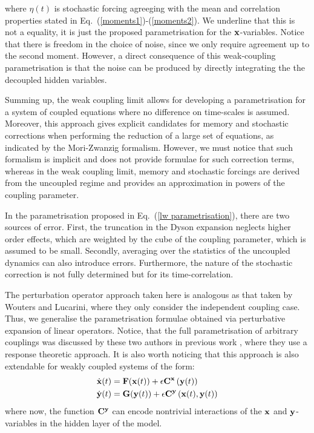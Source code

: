 \documentclass[12pt]{article}
\begin{document}
where $\eta(t)$ is stochastic forcing agreeging with the mean and correlation properties stated in Eq.~(\ref{moments1})-(\ref{moments2}). We underline that this is not a equality, it is just the proposed parametrisation for the $\mathbf{x}$-variables. Notice that there is freedom in the choice of noise, since we only require agreement up to the second moment. However, a direct consequence of this weak-coupling parametrisation is that the noise can be produced by directly integrating the the decoupled hidden variables.

Summing up, the weak coupling limit allows for developing a parametrisation for a system of coupled equations where no difference on time-scales is assumed. Moreover, this approach gives explicit candidates for memory and stochastic corrections when performing the reduction of a large set of equations, as indicated by the Mori-Zwanzig formalism. However, we must notice that such formalism is implicit and does not provide formulae for such correction terms, whereas in the weak coupling limit, memory and stochastic forcings are derived from the uncoupled regime and provides an approximation in powers of the coupling parameter.

In the parametrisation proposed in Eq.~(\ref{lw parametrisation}), there are two sources of error. First, the truncation in the Dyson expansion neglects higher order effects, which are weighted by the cube of the coupling parameter, which is assumed to be small. Secondly, averaging over the statistics of the uncoupled dynamics can also introduce errors. Furthermore, the nature of the stochastic correction is not fully determined but for its time-correlation.

The perturbation operator approach taken here is analogous as that taken by Wouters and Lucarini, where they only consider the independent coupling case. Thus, we generalise the parametrisation formulae obtained via perturbative expansion of linear operators. Notice, that the full parametrisation of arbitrary couplings was discussed by these two authors in previous work \cite{Wouters2012}, where they use a response theoretic approach. It is also worth noticing that this approach is also extendable for weakly coupled systems of the form:
\begin{align}
\label{mle12}
\dot{\mathbf{x}}(t) &= \mathbf{F}(\mathbf{x}(t)) + \epsilon \mathbf{C}^{\mathbf{x}}\left(\mathbf{y}(t) \right) \\
\label{mle22}
\dot{\mathbf{y}}(t) &= \mathbf{G}(\mathbf{y}(t)) + \epsilon \mathbf{C}^{\mathbf{y}}\left(\mathbf{x}(t),\mathbf{y}(t) \right)
\end{align}
where now, the function $\mathbf{C}^{\mathbf{y}}$ can encode nontrivial interactions of the $\mathbf{x}$ and $\mathbf{y}$-variables in the hidden layer of the model.
\end{document}
